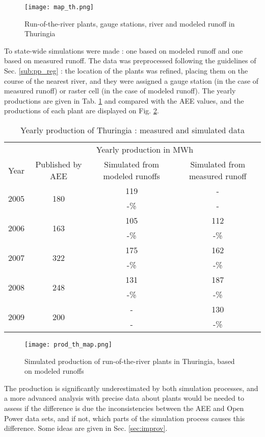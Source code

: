 \begin{figure}[H]
\centering
\texttt{[image: map\_th.png]}
\caption{Run-of-the-river plants, gauge stations, river and modeled runoff in Thuringia}
\label{map_th}
\end{figure}

To state-wide simulations were made : one based on modeled runoff and one based on measured runoff. The data was preprocessed following the guidelines of Sec. \ref{sub:pp_reg} : the location of the plants was refined, placing them on the course of the nearest river, and they were assigned a gauge station (in the case of measured runoff) or raster cell (in the case of modeled runoff). The yearly productions are given in Tab. \ref{res_th} and compared with the AEE values, and the productions of each plant are displayed on Fig. \ref{prod_th_map}.

\begin{table}[H]
\footnotesize
 \centering
 \caption{Yearly production of Thuringia : measured and simulated data}
 \label{res_th}
 \begin{tabular}{|l|ccc|}
 \hline
  &\multicolumn{3}{c|}{Yearly production in MWh}\\
  Year&Published by AEE&Simulated from modeled runoffs&Simulated from measured runoff\\
  \hline \hline
  \multirow{2}{*}{2005}&\multirow{2}{*}{180}&119&-\\
  &&-\unit[34]{\%}&-\\
  \hline
  \multirow{2}{*}{2006}&\multirow{2}{*}{163}&105&112\\
  &&-\unit[36]{\%}&-\unit[31]{\%}\\
  \hline
  \multirow{2}{*}{2007}&\multirow{2}{*}{322}&175&162\\
  &&-\unit[46]{\%}&-\unit[50]{\%}\\
  \hline
  \multirow{2}{*}{2008}&\multirow{2}{*}{248}&131&187\\
  &&-\unit[47]{\%}&-\unit[25]{\%}\\
  \hline
  \multirow{2}{*}{2009}&\multirow{2}{*}{200}&-&130\\
  &&-&-\unit[35]{\%}\\
  \hline
 \end{tabular}
\end{table}

\begin{figure}[H]
\centering
\texttt{[image: prod\_th\_map.png]}
\caption{Simulated production of run-of-the-river plants in Thuringia, based on modeled runoffs}
\label{prod_th_map}
\end{figure}
 
The production is significantly underestimated by both simulation processes, and a more advanced analysis with precise data about plants would be needed to assess if the difference is due the inconsistencies between the AEE and Open Power data sets, and if not, which parts of the simulation process causes this difference. Some ideas are given in Sec. \ref{sec:improv}.